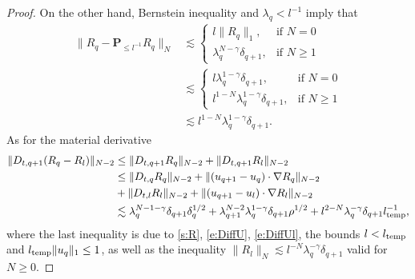 \documentclass[10pt,a4paper]{amsart}
\numberwithin{equation}{section}
\numberwithin{corollario}{section}
\numberwithin{lemma}{section}
\numberwithin{prop}{section}
\theoremstyle{definition}
\theoremstyle{remark}
\newcommand{\proj}{\mathbf{P}}
\newcommand{\qq}{_{q+1}}
\begin{document}
\begin{proof}
On the other hand,  Bernstein inequality and $\lambda_q<l^{-1}$ imply that
   \begin{equation}\label{est:RT2}
   \begin{aligned}
      \| R_q-\proj_{\le l^{-1}}R_q\|_N
      &\lesssim 
      \begin{cases}
          l\|R_q\|_{1}, &\mbox{if } N=0
          \\
           \lambda_q^{N-\gamma}\delta\qq, &\mbox{if } N\geq1
      \end{cases}
      \\
      &\lesssim 
      \begin{cases}
          l \lambda_q^{1-\gamma }\delta\qq, &\mbox{if }N=0
          \\
          l^{1-N}\lambda_q^{1-\gamma}\delta\qq, &\mbox{if }N\geq 1
      \end{cases}\\
      &\lesssim l^{1-N}\lambda_q^{1-\gamma}\delta\qq.
    \end{aligned}
   \end{equation}
As for the material derivative
\begin{equation}\label{est:DRT1}
\begin{aligned}
    \|D_{t,q+1}(R_q-R_l)\|_{N-2}&\le \|D_{t,q+1}R_q\|_{N-2}+\|D_{t,q+1}R_l\|_{N-2}\\
    &\le \|D_{t,q}R_q \|_{N-2}+\|(u\qq-u_q)\cdot \nabla R_q \|_{N-2}\\
    &+\|D_{t,l}R_l \|_{N-2}+\|(u\qq-u_l)\cdot \nabla R_l \|_{N-2}\\
    &\lesssim \lambda_q^{N-1-\gamma}\delta\qq\delta_q^{1/2}+ \lambda\qq^{N-2}\lambda_q^{1-\gamma}\delta\qq \rho^{1/2}+l^{2-N}\lambda_q^{-\gamma}\delta\qq l_{\rm temp}^{-1},
\end{aligned}
\end{equation}
where the last inequality is due to \eqref{s:R}, \eqref{e:DiffU}, \eqref{e:DiffUl}, the bounds $l<l_{\rm temp}$ and $l_{\rm temp}\|u_q\|_1\le 1$, as well as the inequality $\|R_l \|_N\lesssim l^{-N}\lambda_q^{-\gamma}\delta\qq$ valid for $N \geq 0$.


\end{proof}
\end{document}
